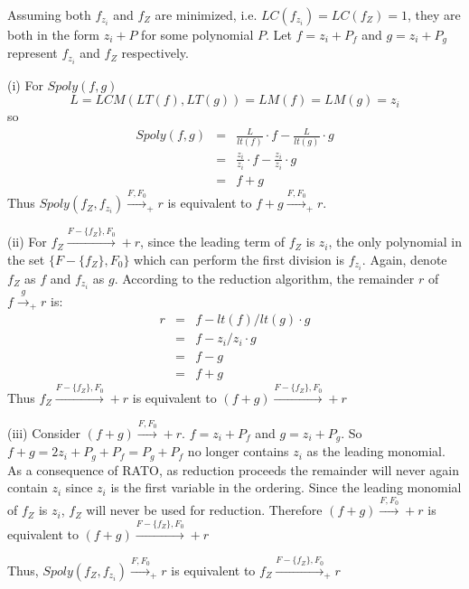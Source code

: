 \begin{Proof}
Assuming both $f_{z_i}$ and $f_Z$ are minimized, i.e. 
$LC(f_{z_i})=LC(f_Z)=1$, 
they are both in the form $z_i+P$ for some polynomial $P$.
Let $f=z_i+P_f$ and $g=z_i+P_g$ represent $f_{z_i}$ and $f_Z$ respectively.

(i) For $Spoly(f,g)$
\begin{equation}
L=LCM(LT(f),LT(g))=LM(f)=LM(g)=z_i
\end{equation}
so
\begin{eqnarray}
Spoly(f,g)&=&\frac{L}{lt(f)}\cdot f - \frac{L}{lt(g)}\cdot g \nonumber \\
&=&\frac{z_i}{z_i}\cdot f - \frac{z_i}{z_i}\cdot g \nonumber \\
&=&f + g \nonumber
\end{eqnarray}
Thus 
$Spoly(f_Z,f_{z_i})\stackrel{F,F_0}{\longrightarrow}_+ r$
is equivalent to 
$f+g\stackrel{F,F_0}{\longrightarrow}_+ r$.

(ii) For $f_Z\xrightarrow{F-\{f_Z\},F_0} + r$, since the leading term 
of $f_Z$ is $z_i$, the only polynomial in the set $\{F-\{f_Z\},F_0\}$
which can perform the first division is $f_{z_i}$. 
Again, denote $f_Z$ as $f$ and $f_{z_i}$ 
as $g$. According to the reduction algorithm, the remainder $r$ of 
$f\stackrel{g}{\longrightarrow}_+ r$ is:
\begin{eqnarray}
r &=& f-lt(f)/lt(g) \cdot g \nonumber \\
  &=& f-z_i/z_i \cdot g \nonumber \\
  &=& f-g \nonumber \\
  &=& f+g
\end{eqnarray}
Thus 
$f_Z\xrightarrow{F-\{f_Z\},F_0} + r$
is equivalent to 
$(f+g)\xrightarrow{F-\{f_Z\},F_0} + r$

(iii) Consider $(f+g)\xrightarrow{F,F_0} + r$. $f=z_i+P_f$ and 
$g=z_i+P_g$. So $f+g=2z_i+P_g+P_f=P_g+P_f$ no longer contains $z_i$ as the 
leading monomial. As a consequence of RATO, as 
reduction proceeds the remainder will never again contain 
$z_i$ since $z_i$ is the first variable in the ordering. 
Since the leading monomial of $f_Z$ is $z_i$, $f_Z$ will never be 
used for reduction. Therefore 
$(f+g)\xrightarrow{F,F_0}+ r$
is equivalent to 
$(f+g)\xrightarrow{F-\{f_Z\},F_0}+ r$

Thus, 
$Spoly(f_Z,f_{z_i})\stackrel{F,F_0}{\longrightarrow}_+ r$
is equivalent to
$f_Z\xrightarrow{F-\{f_Z\},F_0}_+ r$
\end{Proof}

